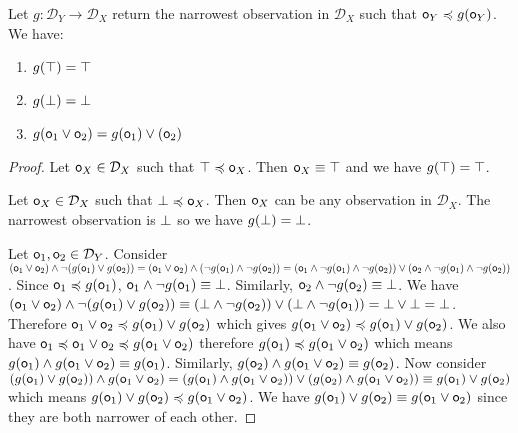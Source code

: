 \documentclass[11pt,letterpaper,fleqn]{memoir} %
\begin{document}
\begin{mathSection}
	\begin{prop}
		Let $g : \mathcal{D}_Y \to \mathcal{D}_X$ return the narrowest observation in $\mathcal{D}_X$ such that $\mathsf{o}_Y \preccurlyeq g(\mathsf{o}_Y)$. We have:
		\begin{enumerate}
			\item $g(\top) = \top$
			\item $g(\bot) = \bot$
			\item $g(\mathsf{o}_1 \vee \mathsf{o}_2) = g(\mathsf{o}_1) \vee (\mathsf{o}_2)$
		\end{enumerate}
	\end{prop}
	\begin{proof}
		Let $\mathsf{o}_X \in \mathcal{D}_X$ such that $\top \preccurlyeq \mathsf{o}_X$. Then $\mathsf{o}_X \equiv \top$ and we have $g(\top) = \top$.
		
		Let $\mathsf{o}_X \in \mathcal{D}_X$ such that $\bot \preccurlyeq \mathsf{o}_X$. Then $\mathsf{o}_X$ can be any observation in $\mathcal{D}_X$. The narrowest observation is $\bot$ so we have $g(\bot) = \bot$.
		
		Let $\mathsf{o}_1, \mathsf{o}_2 \in \mathcal{D}_Y$. Consider $(\mathsf{o}_1 \vee \mathsf{o}_2) \wedge \neg (g(\mathsf{o}_1) \vee g(\mathsf{o}_2)) = (\mathsf{o}_1 \vee \mathsf{o}_2) \wedge (\neg g(\mathsf{o}_1) \wedge \neg g(\mathsf{o}_2)) = (\mathsf{o}_1 \wedge \neg g(\mathsf{o}_1) \wedge \neg g(\mathsf{o}_2)) \vee (\mathsf{o}_2 \wedge \neg g(\mathsf{o}_1) \wedge \neg g(\mathsf{o}_2))$. Since $\mathsf{o}_1 \preccurlyeq g(\mathsf{o}_1)$, $\mathsf{o}_1 \wedge \neg g(\mathsf{o}_1) \equiv \bot$. Similarly, $\mathsf{o}_2 \wedge \neg g(\mathsf{o}_2) \equiv \bot$. We have $(\mathsf{o}_1 \vee \mathsf{o}_2) \wedge \neg (g(\mathsf{o}_1) \vee g(\mathsf{o}_2)) \equiv (\bot \wedge \neg g(\mathsf{o}_2)) \vee (\bot \wedge \neg g(\mathsf{o}_1)) = \bot \vee \bot = \bot$. Therefore $\mathsf{o}_1 \vee \mathsf{o}_2 \preccurlyeq g(\mathsf{o}_1) \vee g(\mathsf{o}_2)$ which gives $g(\mathsf{o}_1 \vee \mathsf{o}_2) \preccurlyeq g(\mathsf{o}_1) \vee g(\mathsf{o}_2)$. We also have $\mathsf{o}_1 \preccurlyeq \mathsf{o}_1 \vee \mathsf{o}_2 \preccurlyeq g(\mathsf{o}_1 \vee \mathsf{o}_2)$ therefore $g(\mathsf{o}_1) \preccurlyeq g(\mathsf{o}_1 \vee \mathsf{o}_2)$ which means $g(\mathsf{o}_1) \wedge g(\mathsf{o}_1 \vee \mathsf{o}_2) \equiv g(\mathsf{o}_1)$. Similarly, $g(\mathsf{o}_2) \wedge g(\mathsf{o}_1 \vee \mathsf{o}_2) \equiv g(\mathsf{o}_2)$. Now consider $(g(\mathsf{o}_1) \vee g(\mathsf{o}_2)) \wedge g(\mathsf{o}_1 \vee \mathsf{o}_2) = (g(\mathsf{o}_1) \wedge g(\mathsf{o}_1 \vee \mathsf{o}_2))\vee(g(\mathsf{o}_2) \wedge g(\mathsf{o}_1 \vee \mathsf{o}_2)) \equiv g(\mathsf{o}_1)\vee g(\mathsf{o}_2)$ which means $g(\mathsf{o}_1) \vee g(\mathsf{o}_2) \preccurlyeq g(\mathsf{o}_1 \vee \mathsf{o}_2)$. We have $g(\mathsf{o}_1) \vee g(\mathsf{o}_2) \equiv g(\mathsf{o}_1 \vee \mathsf{o}_2)$ since they are both narrower of each other.
	\end{proof}
\end{mathSection}
\end{document}
